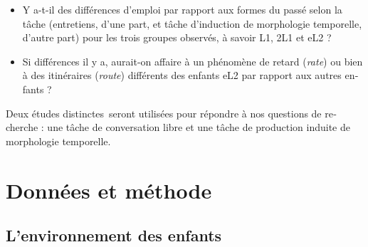 \documentclass[french, output=paper]{langscibook}
\begin{document}
\begin{otherlanguage}{french}
\begin{itemize}
\item 
Y a-t-il des différences d’emploi par rapport aux formes du passé selon la tâche (entretiens, d’une part, et tâche d’induction de morphologie temporelle, d’autre part) pour les trois groupes observés, à savoir L1, 2L1 et eL2 ?

\item 
Si différences il y a, aurait-on affaire à un phénomène de retard (\textit{rate}) ou bien à des itinéraires (\textit{route}) différents des enfants eL2 par rapport aux autres enfants ?

\end{itemize}

Deux études distinctes~seront utilisées pour répondre à nos questions de recherche : une tâche de conversation libre et une tâche de production induite de morphologie temporelle.


\section{Données et méthode}\label{sec:kihlstedt:4}


\subsection{L’environnement des enfants}\label{sec:kihlstedt:4.1}


\end{otherlanguage}
\end{document}
